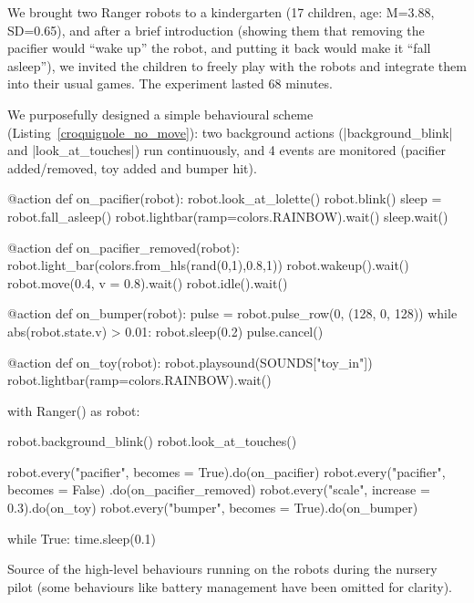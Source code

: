 \documentclass[a4paper, 10pt, conference]{ieeeconf}      %
\begin{document}
We brought two Ranger robots to a kindergarten (17 children, age: M=3.88,
SD=0.65), and after a brief introduction (showing them that removing the
pacifier would ``wake up'' the robot, and putting it back would make it ``fall
asleep''), we invited the children to freely play with the robots and integrate
them into their usual games. The experiment lasted 68 minutes.

We purposefully designed a simple behavioural scheme
(Listing~\ref{croquignole_no_move}): two background actions
(\python|background_blink| and \python|look_at_touches|) run continuously, and 4
events are monitored (pacifier added/removed, toy added and bumper hit).

\begin{listing}[h!]

\begin{pythoncode}
    @action
    def on_pacifier(robot):
        robot.look_at_lolette()
        robot.blink()
        sleep = robot.fall_asleep()
        robot.lightbar(ramp=colors.RAINBOW).wait()
        sleep.wait()
    
    @action
    def on_pacifier_removed(robot):
        robot.light_bar(colors.from_hls(rand(0,1),0.8,1))
        robot.wakeup().wait()
        robot.move(0.4, v = 0.8).wait()
        robot.idle().wait()
    
    @action
    def on_bumper(robot):
        pulse = robot.pulse_row(0, (128, 0, 128))
        while abs(robot.state.v) > 0.01:
            robot.sleep(0.2)
        pulse.cancel()
    
    @action
    def on_toy(robot):
        robot.playsound(SOUNDS["toy_in"])
        robot.lightbar(ramp=colors.RAINBOW).wait()
    
    with Ranger() as robot:
    
        robot.background_blink()
        robot.look_at_touches()
    
        robot.every("pacifier", becomes = True).do(on_pacifier)
        robot.every("pacifier", becomes = False)
                                       .do(on_pacifier_removed)
        robot.every("scale", increase = 0.3).do(on_toy)
        robot.every("bumper", becomes = True).do(on_bumper)
    
        while True:
            time.sleep(0.1)
\end{pythoncode}
\caption{Source of the high-level behaviours running on the robots during the
nursery pilot (some behaviours like battery management have been omitted for
clarity).}
\label{croquignole_no_move}
\end{listing}
\end{document}
